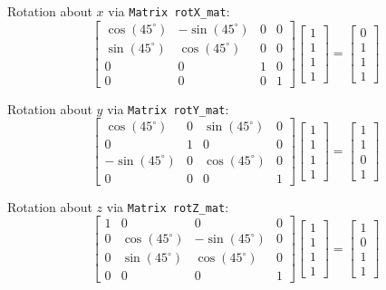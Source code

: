 \documentclass[10pt,twocolumn]{article}
\renewcommand{\deg}{^\circ}
\begin{document}
\begin{framed}
Rotation about $x$ via {\tt Matrix rotX\_mat}:
\[ \begin{bmatrix}
    \cos(45\deg) & -\sin(45\deg) & 0 & 0 \\
    \sin(45\deg) &  \cos(45\deg) & 0 & 0 \\
               0 &             0 & 1 & 0 \\
               0 &             0 & 0 & 1
\end{bmatrix}
\begin{bmatrix}
    1 \\
    1 \\
    1 \\
    1
\end{bmatrix}
=
\begin{bmatrix}
    0 \\
    1 \\
    1 \\
    1
\end{bmatrix}\]

Rotation about $y$ via {\tt Matrix rotY\_mat}:
\[ \begin{bmatrix}
    \cos(45\deg)  & 0 & \sin(45\deg) & 0 \\
               0  & 1 &            0 & 0 \\
    -\sin(45\deg) & 0 & \cos(45\deg) & 0 \\
               0  & 0 &            0 & 1
\end{bmatrix}
\begin{bmatrix}
    1 \\
    1 \\
    1 \\
    1
\end{bmatrix}
=
\begin{bmatrix}
    1 \\
    1 \\
    0 \\
    1
\end{bmatrix}\]

Rotation about $z$ via {\tt Matrix rotZ\_mat}:
\[ \begin{bmatrix}
    1 &            0 &             0 & 0 \\
    0 & \cos(45\deg) & -\sin(45\deg) & 0 \\
    0 & \sin(45\deg) &  \cos(45\deg) & 0 \\
               0 &             0 & 0 & 1
\end{bmatrix}
\begin{bmatrix}
    1 \\
    1 \\
    1 \\
    1
\end{bmatrix}
=
\begin{bmatrix}
    1 \\
    0 \\
    1 \\
    1
\end{bmatrix}\]
\end{framed}
\end{document}
